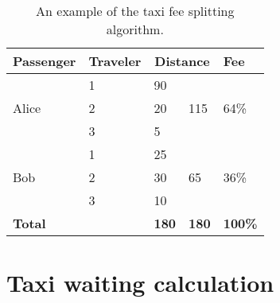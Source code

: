 \begin{table}
\begin{center}
\begin{tabular}{ l  l  l  l  l }
    \hline
    \textbf{Passenger} & \textbf{Traveler} & \multicolumn{2}{c}{\textbf{Distance}} & \textbf{Fee} \\
    \hline
    \multirow{3}{*}{Alice} & 1 & 90 & \multirow{3}{*}{115} & \multirow{3}{*}{64\%} \\
    & 2 & 20 & & \\
    & 3 & 5 & & \\
    \hline
    \multirow{3}{*}{Bob} & 1 & 25 & \multirow{3}{*}{65} & \multirow{3}{*}{36\%} \\
    & 2 & 30 & & \\
    & 3 & 10 & & \\
    \hline
    \textbf{Total} & & \textbf{180} & \textbf{180} & \textbf{100\%} \\
    \hline
\end{tabular}
\caption{An example of the taxi fee splitting algorithm.}
\label{fee-splitting-ex}
\end{center}
\end{table}

\section{Taxi waiting calculation}
